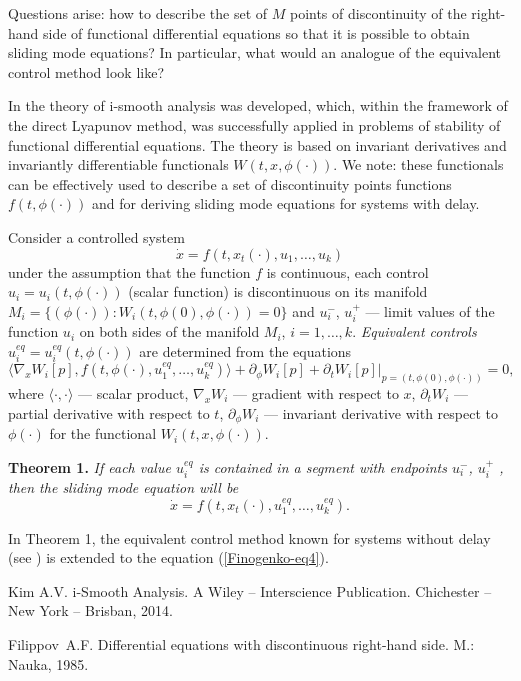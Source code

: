 \documentclass[12pt]{llncs}
\begin{document}
Questions arise: how to describe the set of $M$ points of discontinuity of the right-hand side of functional differential equations so that it is possible to obtain sliding mode equations? In particular, what would an analogue of the equivalent control method look like?

In 
\cite{Finogenko-first}
the theory of i-smooth analysis was developed, which, within the framework of the direct Lyapunov method, was successfully applied in problems of stability of functional differential equations. The theory is based on invariant derivatives and invariantly differentiable functionals $W(t,x,\phi(\cdot))$.
We note: these functionals can be effectively used to describe a set of discontinuity points
functions $f(t,\phi(\cdot))$
and for deriving sliding mode equations for systems with delay. 

Consider a controlled system
\begin{equation}
	\label{Finogenko-eq4}
	\dot{x}=f(t,x_{t}(\cdot),u_{1},\ldots,u_{k})
\end{equation}
under the assumption that the function $f$ is continuous, each control $u_{i}=u_{i}(t,\phi(\cdot))$ (scalar function) is discontinuous on its manifold
${M_{i}=\{(\phi(\cdot)): W_{i}(t,\phi(0),\phi(\cdot))=0\}}$
and $u_{i}^{-}$, $u_{i}^{+}$ --- limit values of the function $u_{i}$ on both sides of the manifold $M_{i}$, $i=1, \dots,k$. {\em Equivalent controls} $u_{i}^{eq}=u_{i}^{eq}(t,\phi(\cdot))$ are determined from the equations
$$
\langle \nabla_x W_{i}[p],f(t,\phi(\cdot),u_{1}^{eq},\ldots,u_{k}^{eq})\rangle + \partial_\phi W_{i}[p]+\partial_{t}W_{i}[p] \bigg|_{p=(t,\phi(0),\phi(\cdot))} =0,
$$
where $\langle \cdot,\cdot\rangle$ --- scalar product, $\nabla_x W_{i}$ --- gradient with respect to $x$, $\partial_{t}W_{i}$ --- partial derivative with respect to $t$, $\partial_\phi W_{i}$ --- invariant derivative with respect to $\phi(\cdot)$ for the functional $W_{i}(t,x,\phi(\cdot)) $.

{\bf Theorem 1.} {\it If each value $u^{eq}_{i}$ is contained in a segment with endpoints $u_{i}^{-}$, $u_{i}^{+}$ , then the sliding mode equation will be
	\begin{equation}
		\label{Finogenko-eq5}
		\dot{x}=f(t,x_{t}(\cdot),u^{eq}_{1},\ldots,u^{eq}_{k}).
	\end{equation}
}


In Theorem 1, the equivalent control method known for systems without delay (see \cite{Finogenko-first}) is extended
to the equation
(\ref{Finogenko-eq4}).


\begin{thebibliography}{9}	
	
		 Kim A.V. i-Smooth Analysis. A Wiley -- Interscience Publication. Chichester -- New York -- Brisban, 2014. 
	
	 Filippov~A.F. Differential equations with discontinuous right-hand side. 	
	M.: Nauka, 1985. 
	
\end{thebibliography}


\end{document}
